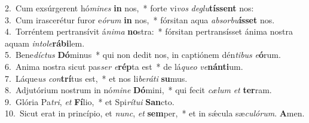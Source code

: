 {2.~}Cum exsúrgerent hó\textit{mi}\textit{nes} \textbf{in} nos,~* forte vi\textit{vos} \textit{de}\textit{glu}\textbf{tís}\textbf{sent} nos:\\
{3.~}Cum irascerétur furor e\textit{ó}\textit{rum} \textbf{in} nos,~* fórsitan aqua \textit{ab}\textit{sor}\textit{bu}\textbf{ís}\textbf{set} nos.\\
{4.~}Torréntem pertransívit á\textit{ni}\textit{ma} \textbf{no}stra:~* fórsitan pertransísset ánima nostra aquam \textit{in}\textit{to}\textit{le}\textbf{rá}\textbf{bi}lem.\\
{5.~}Bene\textit{dí}\textit{ctus} \textbf{Dó}minus~* qui non dedit nos, in captiónem dén\textit{ti}\textit{bus} \textit{e}\textbf{ó}rum.\\
{6.~}Anima nostra sicut pas\textit{ser} \textit{e}\textbf{rép}ta est~* de lá\textit{que}\textit{o} \textit{ve}\textbf{nán}\textbf{ti}um.\\
{7.~}Láque\textit{us} \textit{con}\textbf{trí}tus est,~* et nos li\textit{be}\textit{rá}\textit{ti} \textbf{su}mus.\\
{8.~}Adjutórium nostrum in nó\textit{mi}\textit{ne} \textbf{Dó}mini,~* qui fecit \textit{cæ}\textit{lum} \textit{et} \textbf{ter}ram.\\
{9.~}Glória Pa\textit{tri}, \textit{et} \textbf{Fí}lio,~* et Spi\textit{rí}\textit{tu}\textit{i} \textbf{San}cto.\\
{10.~}Sicut erat in princípio, et \textit{nunc}, \textit{et} \textbf{sem}per,~* et in sǽcula sæ\textit{cu}\textit{ló}\textit{rum}. \textbf{A}men.\\
